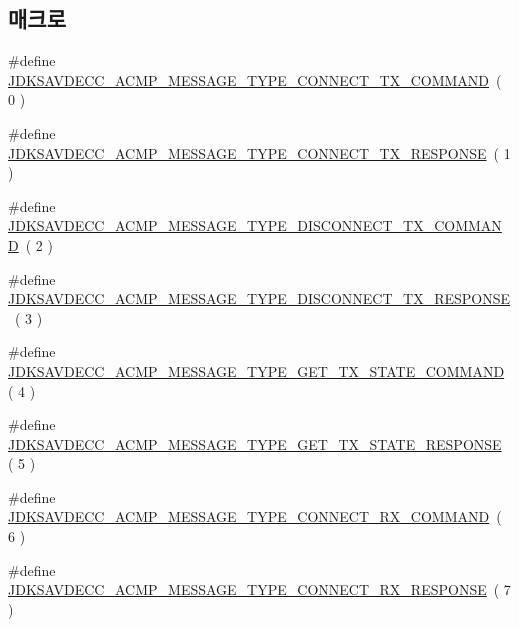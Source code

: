 \subsection*{매크로}
\begin{DoxyCompactItemize}
\item 
\#define \hyperlink{group__acmp__message__type_ga4c797809a020eb9136a2eb15d0d12b4b}{J\+D\+K\+S\+A\+V\+D\+E\+C\+C\+\_\+\+A\+C\+M\+P\+\_\+\+M\+E\+S\+S\+A\+G\+E\+\_\+\+T\+Y\+P\+E\+\_\+\+C\+O\+N\+N\+E\+C\+T\+\_\+\+T\+X\+\_\+\+C\+O\+M\+M\+A\+ND}~( 0 )
\item 
\#define \hyperlink{group__acmp__message__type_ga8741f7b79c14f05c76e2022403baddf2}{J\+D\+K\+S\+A\+V\+D\+E\+C\+C\+\_\+\+A\+C\+M\+P\+\_\+\+M\+E\+S\+S\+A\+G\+E\+\_\+\+T\+Y\+P\+E\+\_\+\+C\+O\+N\+N\+E\+C\+T\+\_\+\+T\+X\+\_\+\+R\+E\+S\+P\+O\+N\+SE}~( 1 )
\item 
\#define \hyperlink{group__acmp__message__type_ga887372d1f09ad5c23a4d521b4ef17764}{J\+D\+K\+S\+A\+V\+D\+E\+C\+C\+\_\+\+A\+C\+M\+P\+\_\+\+M\+E\+S\+S\+A\+G\+E\+\_\+\+T\+Y\+P\+E\+\_\+\+D\+I\+S\+C\+O\+N\+N\+E\+C\+T\+\_\+\+T\+X\+\_\+\+C\+O\+M\+M\+A\+ND}~( 2 )
\item 
\#define \hyperlink{group__acmp__message__type_ga5e2920ff56766d33638c095d45736024}{J\+D\+K\+S\+A\+V\+D\+E\+C\+C\+\_\+\+A\+C\+M\+P\+\_\+\+M\+E\+S\+S\+A\+G\+E\+\_\+\+T\+Y\+P\+E\+\_\+\+D\+I\+S\+C\+O\+N\+N\+E\+C\+T\+\_\+\+T\+X\+\_\+\+R\+E\+S\+P\+O\+N\+SE}~( 3 )
\item 
\#define \hyperlink{group__acmp__message__type_gae111bf6de86b42a7dd6c8de3128a1eb9}{J\+D\+K\+S\+A\+V\+D\+E\+C\+C\+\_\+\+A\+C\+M\+P\+\_\+\+M\+E\+S\+S\+A\+G\+E\+\_\+\+T\+Y\+P\+E\+\_\+\+G\+E\+T\+\_\+\+T\+X\+\_\+\+S\+T\+A\+T\+E\+\_\+\+C\+O\+M\+M\+A\+ND}~( 4 )
\item 
\#define \hyperlink{group__acmp__message__type_gaf9b24b0190d5bf9cae7e37c4a31cda12}{J\+D\+K\+S\+A\+V\+D\+E\+C\+C\+\_\+\+A\+C\+M\+P\+\_\+\+M\+E\+S\+S\+A\+G\+E\+\_\+\+T\+Y\+P\+E\+\_\+\+G\+E\+T\+\_\+\+T\+X\+\_\+\+S\+T\+A\+T\+E\+\_\+\+R\+E\+S\+P\+O\+N\+SE}~( 5 )
\item 
\#define \hyperlink{group__acmp__message__type_gaf72da38ed84005b55360db3bea1a2e5e}{J\+D\+K\+S\+A\+V\+D\+E\+C\+C\+\_\+\+A\+C\+M\+P\+\_\+\+M\+E\+S\+S\+A\+G\+E\+\_\+\+T\+Y\+P\+E\+\_\+\+C\+O\+N\+N\+E\+C\+T\+\_\+\+R\+X\+\_\+\+C\+O\+M\+M\+A\+ND}~( 6 )
\item 
\#define \hyperlink{group__acmp__message__type_ga387118815f681eccff5e5b1a2025b1c4}{J\+D\+K\+S\+A\+V\+D\+E\+C\+C\+\_\+\+A\+C\+M\+P\+\_\+\+M\+E\+S\+S\+A\+G\+E\+\_\+\+T\+Y\+P\+E\+\_\+\+C\+O\+N\+N\+E\+C\+T\+\_\+\+R\+X\+\_\+\+R\+E\+S\+P\+O\+N\+SE}~( 7 )

\end{DoxyCompactItemize}
